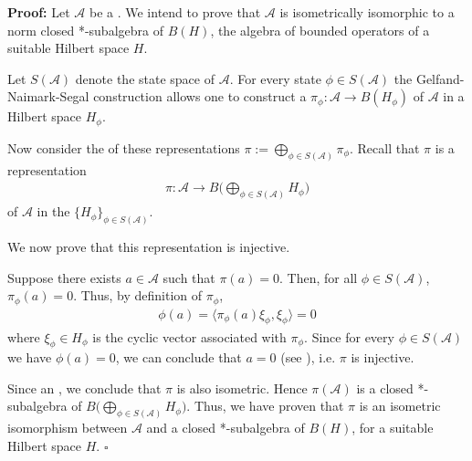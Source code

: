\documentclass[12pt]{article}
\begin{document}

{\bf Proof:} Let $\mathcal{A}$ be a . We intend to prove that $\mathcal{A}$ is isometrically isomorphic to a norm closed *-subalgebra of $B(H)$, the algebra of bounded operators of a suitable Hilbert space $H$.

Let $S(\mathcal{A})$ denote the state space of $\mathcal{A}$. For every state $\phi \in S(\mathcal{A})$ the Gelfand-Naimark-Segal construction allows one to construct a  $\pi_{\phi}: \mathcal{A} \longrightarrow B(H_{\phi})$ of $\mathcal{A}$ in a Hilbert space $H_{\phi}$.

Now consider the  of these representations $\displaystyle \pi := \bigoplus_{\phi \in S(\mathcal{A})} \pi_{\phi}$. Recall that $\pi$ is a representation
\begin{align*}
\pi:\mathcal{A} \longrightarrow B\Big(\bigoplus_{\phi \in S(\mathcal{A})} H_{\phi}\Big)
\end{align*}
of $\mathcal{A}$ in the  $\{H_{\phi}\}_{\phi \in S(\mathcal{A})}$.

We now prove that this representation is injective.

Suppose there exists $a \in \mathcal{A}$ such that $\pi(a)=0$. Then, for all $\phi \in S(\mathcal{A})$, $\pi_{\phi}(a)=0$.  Thus, by definition of $\pi_{\phi}$,
\begin{align*}
\phi(a)=\langle \pi_{\phi}(a) \xi_{\phi}, \xi_{\phi} \rangle = 0
\end{align*}
where $\xi_{\phi} \in H_{\phi}$ is the cyclic vector associated with $\pi_{\phi}$. Since for every $\phi \in S(\mathcal{A})$ we have $\phi(a)=0$, we can conclude that $a=0$ (see ), i.e. $\pi$ is injective.

Since an , we conclude that $\pi$ is also isometric. Hence $\pi(\mathcal{A})$ is a closed *-subalgebra of $\displaystyle B\Big(\bigoplus_{\phi \in S(\mathcal{A})} H_{\phi}\Big)$. Thus, we have proven that $\pi$ is an isometric isomorphism between $\mathcal{A}$ and a closed *-subalgebra of $B(H)$, for a suitable Hilbert space $H$. $\square$
\end{document}
